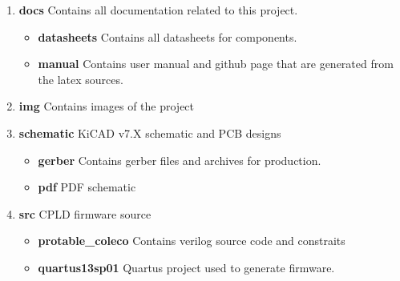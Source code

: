 \begin{enumerate}
  \item \textbf{docs} Contains all documentation related to this project.
    \begin{itemize}
      \item \textbf{datasheets} Contains all datasheets for components.
      \item \textbf{manual} Contains user manual and github page that are generated from the latex sources.
    \end{itemize}
  \item \textbf{img} Contains images of the project
  \item \textbf{schematic} KiCAD v7.X schematic and PCB designs
    \begin{itemize}
      \item \textbf{gerber} Contains gerber files and archives for production.
      \item \textbf{pdf} PDF schematic
    \end{itemize}
  \item \textbf{src} CPLD firmware source
    \begin{itemize}
      \item \textbf{protable\_coleco} Contains verilog source code and constraits
      \item \textbf{quartus13sp01} Quartus project used to generate firmware.
    \end{itemize}
\end{enumerate}
